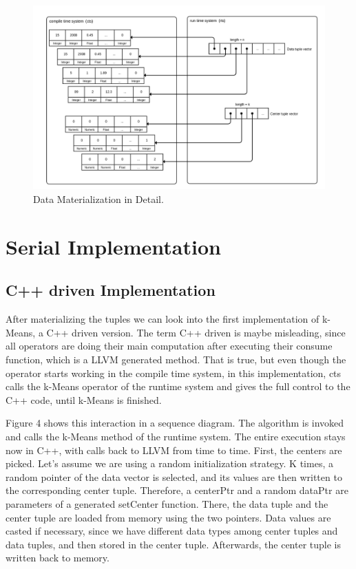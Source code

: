 \begin{figure}[htsb]
  \centering
  \includegraphics[scale=0.25]{figures/mat3}
  \caption[Data Materialization in Detail]{Data Materialization in Detail.}
  \label{fig:mat3}
\end{figure}




\section{Serial Implementation}


\subsection{C++ driven Implementation}

After materializing the tuples we can look into the first implementation of k-Means, a C++ driven version. The term C++ driven is maybe misleading, since all operators are doing their main computation after executing their consume function, which is a LLVM generated method. That is true, but even though the operator starts working in the compile time system, in this implementation, cts calls the k-Means operator of the runtime system and gives the full control to the C++ code, until k-Means is finished. 

Figure 4 shows this interaction in a sequence diagram. The algorithm is invoked and calls the k-Means method of the runtime system. The entire execution stays now in C++, with calls back to LLVM from time to time. First, the centers are picked. Let’s assume we are using a random initialization strategy. K times, a random pointer of the data vector is selected, and its values are then written to the corresponding center tuple. Therefore, a centerPtr and a random dataPtr are parameters of a generated setCenter function. There, the data tuple and the center tuple are loaded from memory using the two pointers. Data values are casted if necessary, since we have different data types among center tuples and data tuples, and then stored in the center tuple. Afterwards, the center tuple is written back to memory.


